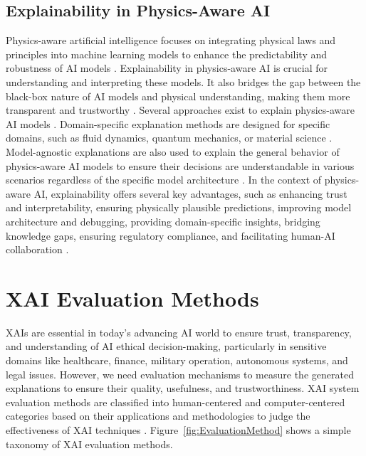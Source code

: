 \documentclass[final,5p,times,twocolumn]{elsarticle}
\begin{document}
\subsection{Explainability in Physics-Aware AI}
Physics-aware artificial intelligence focuses on integrating physical laws and principles into machine learning models to enhance the predictability and robustness of AI models \cite{willard2020integrating}. Explainability in physics-aware AI is crucial for understanding and interpreting these models. It also bridges the gap between the black-box nature of AI models and physical understanding, making them more transparent and trustworthy \cite{datcu2023explainable}. Several approaches exist to explain physics-aware AI models \cite{willard2022integrating}. Domain-specific explanation methods are designed for specific domains, such as fluid dynamics, quantum mechanics, or material science \cite{huang2022physically, crocker2023using}. Model-agnostic explanations are also used to explain the general behavior of physics-aware AI models to ensure their decisions are understandable in various scenarios regardless of the specific model architecture \cite{sadeghi2023explainable, roscher2020explainable}. In the context of physics-aware AI, explainability offers several key advantages, such as enhancing trust and interpretability, ensuring physically plausible predictions, improving model architecture and debugging, providing domain-specific insights, bridging knowledge gaps, ensuring regulatory compliance, and facilitating human-AI collaboration \cite{datcu2023explainable, tuia2023artificial}.



\section{XAI Evaluation Methods}
\label{Evaluation}
XAIs are essential in today’s advancing AI world to ensure trust, transparency, and understanding of AI ethical decision-making, particularly in sensitive domains like healthcare, finance, military operation, autonomous systems, and legal issues. However, we need evaluation mechanisms to measure the generated explanations to ensure their quality, usefulness, and trustworthiness. XAI system evaluation methods are classified into human-centered and computer-centered categories based on their applications and methodologies to judge the effectiveness of XAI techniques \cite{lopes2022xai, hassija2024interpreting}. Figure~\ref{fig:EvaluationMethod} shows a simple taxonomy of XAI evaluation methods. 
\end{document}
